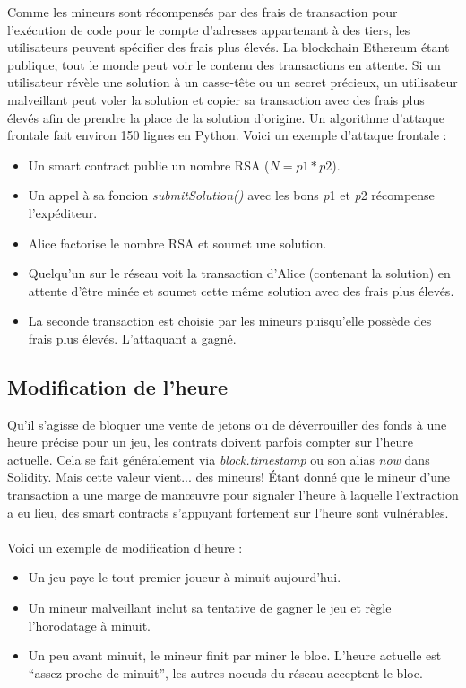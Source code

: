 \documentclass[12pt, a4paper, oneside]{book}
\begin{document}
    Comme les mineurs sont récompensés par des frais de transaction pour l'exécution de code pour le compte d'adresses appartenant à des tiers, les utilisateurs peuvent spécifier des frais plus élevés. La blockchain Ethereum étant publique, tout le monde peut voir le contenu des transactions en attente. Si un utilisateur révèle une solution à un casse-tête ou un secret précieux, un utilisateur malveillant peut voler la solution et copier sa transaction avec des frais plus élevés afin de prendre la place de la solution d'origine. Un algorithme d'attaque frontale fait environ 150 lignes en Python.
    \newpage
    Voici un exemple d'attaque frontale :

    \begin{itemize}
        \item Un smart contract publie un nombre RSA ($N = p1 * p2$).
        \item Un appel à sa foncion \emph{submitSolution()} avec les bons \emph{p}1 et \emph{p}2 récompense l'expéditeur.
        \item Alice factorise le nombre RSA et soumet une solution.
        \item Quelqu'un sur le réseau voit la transaction d'Alice (contenant la solution) en attente d'être minée et soumet cette même solution avec des frais plus élevés.
        \item La seconde transaction est choisie par les mineurs puisqu'elle possède des frais plus élevés. L'attaquant a gagné.
    \end{itemize}

    \subsection{Modification de l'heure}

    Qu'il s'agisse de bloquer une vente de jetons ou de déverrouiller des fonds à une heure précise pour un jeu, les contrats doivent parfois compter sur l'heure actuelle. Cela se fait généralement via \emph{block.timestamp} ou son alias \emph{now} dans Solidity. Mais cette valeur vient... des mineurs! Étant donné que le mineur d'une transaction a une marge de manœuvre pour signaler l'heure à laquelle l'extraction a eu lieu, des smart contracts s'appuyant fortement sur l'heure sont vulnérables.
    \\
    \\
    Voici un exemple de modification d'heure :

    \begin{itemize}
        \item Un jeu paye le tout premier joueur à minuit aujourd'hui.
        \item Un mineur malveillant inclut sa tentative de gagner le jeu et règle l'horodatage à minuit.
        \item Un peu avant minuit, le mineur finit par miner le bloc. L'heure actuelle est \hyphenquote{french}{assez proche de minuit}, les autres noeuds du réseau acceptent le bloc.
    \end{itemize}
\end{document}
